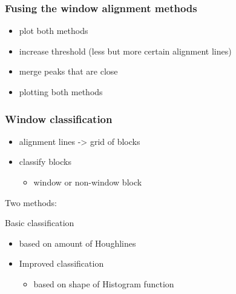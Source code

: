 \documentclass{beamer}
\begin{document}
\frame
{
}




\frame
{
	\frametitle{Fusing the window alignment methods}
	\begin{itemize}
	\item plot both methods
	\item increase threshold (less but more certain alignment lines)
	\item merge peaks that are close
	\item plotting both methods
	\end{itemize}
}

\frame
{
}


\frame
{
}

\frame
{
}

\frame
{
}

\frame
{
}


\frame
{
	\frametitle{Window classification}
	\begin{itemize}
	\item alignment lines -> grid of blocks
	\item classify blocks 
		\begin{itemize}
		\item window or non-window block
		\end{itemize}
	\end{itemize}
	\item Two methods:
	\item Basic classification 
		\begin{itemize}
		\item based on amount of Houghlines
		\end{itemize}
	\begin{itemize}
	\item Improved classification 
		\begin{itemize}
		\item based on shape of Histogram function
		\end{itemize}
	\end{itemize}
}
\end{document}
